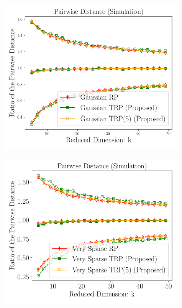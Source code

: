\begin{figure}[H]
	\centering
	\begin{subfigure}{0.24\textwidth}
		\includegraphics[scale = 0.22]{figure/dist_g_d2500.pdf}
	\end{subfigure}
	\begin{subfigure}{0.24\textwidth}
		\includegraphics[scale = 0.22]{figure/dist_sp1_d2500.pdf}
	\end{subfigure}
	\begin{subfigure}{0.24\textwidth}

\end{subfigure}
\end{figure}
